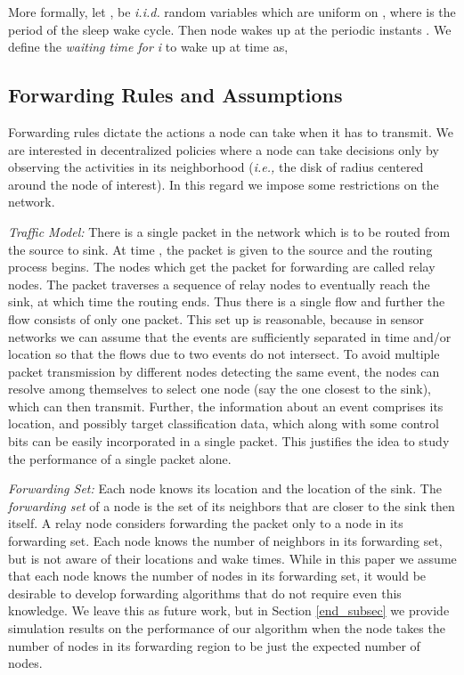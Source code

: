 \documentclass[onecolumn]{IEEEtran}
\begin{document}
More formally, let ,  be \emph{i.i.d.} random variables
which are uniform on , where  is the period of the sleep
wake cycle. Then node  wakes up at the periodic instants .  We define the \emph{waiting time for i} to wake up at time
 as,
 
\subsection{Forwarding Rules and Assumptions}
Forwarding rules dictate the actions a node can take when it has to
transmit. We are interested in decentralized policies where a node can
take decisions only by observing the activities in its neighborhood
(\emph{i.e.,} the disk of radius  centered around the node of
interest). In this regard we impose some restrictions on the network.

\noindent
\emph{Traffic Model:} There is a single packet in the network which is
to be routed from the source to sink.  At time , the packet is
given to the source and the routing process begins. The nodes which
get the packet for forwarding are called relay nodes. The packet
traverses a sequence of relay nodes to eventually reach the sink, at
which time the routing ends.  Thus there is a single flow and further
the flow consists of only one packet. This set up is reasonable,
because in sensor networks we can assume that the events are
sufficiently separated in time and/or location so that the flows due
to two events do not intersect. To avoid multiple packet transmission
by different nodes detecting the same event, the nodes can resolve
among themselves to select one node (say the one closest to the sink),
which can then transmit. Further, the information about an event
comprises its location, and possibly target classification data, which
along with some control bits can be easily incorporated in a single
packet. This justifies the idea to study the performance of a single
packet alone. 

\noindent
\emph{Forwarding Set:} Each node knows its location and the location
of the sink. The \emph{forwarding set} of a node is the set of its
neighbors that are closer to the sink then itself.  A relay node
considers forwarding the packet only to a node in its forwarding set.
Each node knows the number of neighbors in its forwarding set, but is
not aware of their locations and wake times.  While in this paper we
assume that each node knows the number of nodes in its forwarding set,
it would be desirable to develop forwarding algorithms that do not
require even this knowledge. We leave this as future work, but in
Section \ref{end_subsec} we provide simulation results on the
performance of our algorithm when the node takes the number of nodes
in its forwarding region to be just the expected number of nodes.
\end{document}
